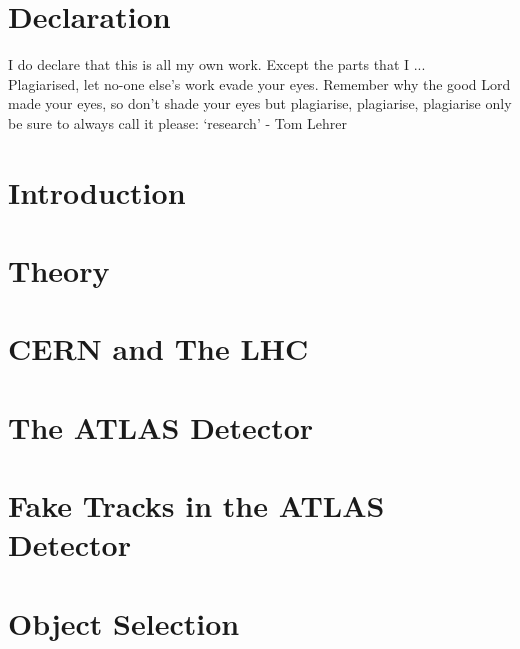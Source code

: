 \documentclass[12pt,titlepage,oneside]{book}
\begin{document}
\chapter{Declaration}
I do declare that this is all my own work. Except the parts that I ... \\ Plagiarised, let no-one else's work evade your eyes. Remember why the good Lord made your eyes, so don't shade your eyes but plagiarise, plagiarise, plagiarise only be sure to always call it please: `research' - Tom Lehrer

\singlespacing

\tableofcontents
\cleardoublepage

{}
\listoffigures
\cleardoublepage

{}
\listoftables

\doublespacing

\mainmatter %

\chapter{Introduction}
\label{chap:intro}


\chapter{Theory}
\label{chap:theory}


\chapter{CERN and The LHC}
\label{chap:CERNLHC}


\chapter{The ATLAS Detector}
\label{chap:ATLAS}


\chapter{Fake Tracks in the ATLAS Detector}
\label{chap:FakeTracks}


\chapter{Object Selection}
\label{chap:ObjSel}

\end{document}
